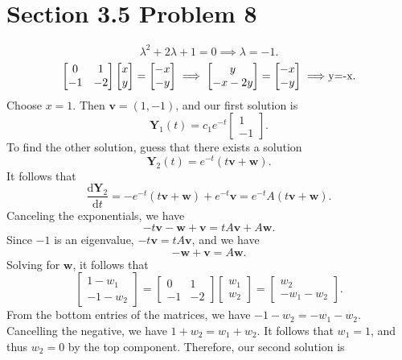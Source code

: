 \documentclass[11pt, letterpaper]{report}
\begin{document}
\section*{Section 3.5 Problem 8}
\[
	\lambda ^2+2\lambda +1=0 \implies \lambda=-1
.\]
\[
	\begin{bmatrix} 0&1 \\ -1&-2 \end{bmatrix} \begin{bmatrix} x \\ y \end{bmatrix} =\begin{bmatrix} -x \\ -y \end{bmatrix} \implies \begin{bmatrix} y \\ -x-2y \end{bmatrix} =\begin{bmatrix} -x \\ -y \end{bmatrix} \implies $y=-x$
.\]
Choose $x=1$. Then $\mathbf{v}=(1,-1)$, and our first solution is
\[
	\mathbf{Y}_1(t)=c_1 e^{-t}\begin{bmatrix} 1 \\ -1 \end{bmatrix} 
.\]
To find the other solution, guess that there exists a solution
\[
	\mathbf{Y}_2(t)=e^{-t}\left( t \mathbf{v}+\mathbf{w} \right)
.\]
It follows that
\[
	\frac{\mathrm{d}\mathbf{Y}_2}{\mathrm{d}t} =-e ^{-t}(t\mathbf{v}+\mathbf{w})+e^{-t}\mathbf{v}=e ^{-t}A\left( t\mathbf{v}+\mathbf{w} \right) 
.\]
Canceling the exponentials, we have
\[
	-t\mathbf{v}-\mathbf{w}+\mathbf{v}=tA\mathbf{v}+A\mathbf{w}
.\]
Since $-1$ is an eigenvalue, $-t \mathbf{v}=tA \mathbf{v}$, and we have
\[
	-\mathbf{w}+\mathbf{v}=A \mathbf{w}
.\]
Solving for $\mathbf{w}$, it follows that
\[
	\begin{bmatrix} 1-w_1 \\ -1-w_2 \end{bmatrix} =\begin{bmatrix} 0&1 \\ -1&-2 \end{bmatrix} \begin{bmatrix} w_1 \\ w_2 \end{bmatrix} =\begin{bmatrix} w_2 \\ -w_1-w_2 \end{bmatrix} 
.\]
From the bottom entries of the matrices, we have $-1-w_2=-w_1-w_2$. Cancelling the negative, we have $1+w_2=w_1+w_2$. It follows that $w_1=1$, and thus $w_2=0$ by the top component. Therefore, our second solution is
\end{document}
